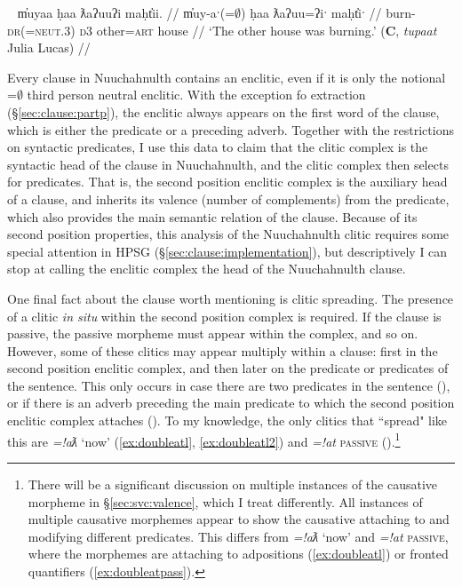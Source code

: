 \ex~ \label{ex:2padjpart}
\begingl
\glpreamble m̓uyaa ḥaa ƛaʔuuʔi maḥt̓ii. //
\gla m̓uy-aˑ(=$\emptyset$) ḥaa ƛaʔuu=ʔiˑ maḥt̓iˑ  //
\glb burn-\textsc{dr}(=\textsc{neut.3}) \textsc{d3} other=\textsc{art} house //
\glft `The other house was burning.' (\textbf{C}, \textit{tupaat} Julia Lucas) //
\endgl
\xe


Every clause in Nuuchahnulth contains an enclitic, even if it is only the notional =$\emptyset$ third person neutral enclitic. With the exception fo extraction (\S\ref{sec:clause:partp}), the enclitic always appears on the first word of the clause, which is either the predicate or a preceding adverb. Together with the restrictions on syntactic predicates, I use this data to claim that the clitic complex is the syntactic head of the clause in Nuuchahnulth, and the clitic complex then selects for predicates. That is, the second position enclitic complex is the auxiliary head of a clause, and inherits its valence (number of complements) from the predicate, which also provides the main semantic relation of the clause. Because of its second position properties, this analysis of the Nuuchahnulth clitic requires some special attention in HPSG (\S\ref{sec:clause:implementation}), but descriptively I can stop at calling the enclitic complex the head of the Nuuchahnulth clause.

One final fact about the clause worth mentioning is clitic spreading. The presence of a clitic \textit{in situ} within the second position complex is required. If the clause is passive, the passive morpheme must appear within the complex, and so on. However, some of these clitics may appear multiply within a clause: first in the second position enclitic complex, and then later on the predicate or predicates of the sentence. This only occurs in case there are two predicates in the sentence (), or if there is an adverb preceding the main predicate to which the second position enclitic complex attaches (). To my knowledge, the only clitics that ``spread" like this are \textit{=!aƛ} `now' (\ref{ex:doubleatl}, \ref{ex:doubleatl2}) and \textit{=!at} \textsc{passive} ().\footnote{There will be a significant discussion on multiple instances of the causative morpheme in \S\ref{sec:svc:valence}, which I treat differently. All instances of multiple causative morphemes appear to show the causative attaching to and modifying different predicates. This differs from \textit{=!aƛ} `now' and \textit{=!at} \textsc{passive}, where the morphemes are attaching to adpositions (\ref{ex:doubleatl}) or fronted quantifiers (\ref{ex:doubleatpass}).}

